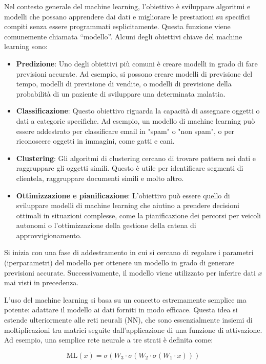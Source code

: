 Nel contesto generale del machine learning, l'obiettivo è sviluppare algoritmi e modelli che possano apprendere dai dati e migliorare le prestazioni su specifici compiti senza essere programmati esplicitamente. Questa funzione viene comunemente chiamata ``modello''. Alcuni degli obiettivi chiave del machine learning sono:

\begin{itemize}
    \item \textbf{Predizione}: Uno degli obiettivi più comuni è creare modelli in grado di fare previsioni accurate. Ad esempio, si possono creare modelli di previsione del tempo, modelli di previsione di vendite, o modelli di previsione della probabilità di un paziente di sviluppare una determinata malattia.
    \item \textbf{Classificazione}: Questo obiettivo riguarda la capacità di assegnare oggetti o dati a categorie specifiche. Ad esempio, un modello di machine learning può essere addestrato per classificare email in "spam" o "non spam", o per riconoscere oggetti in immagini, come gatti e cani.
    \item \textbf{Clustering}: Gli algoritmi di clustering cercano di trovare pattern nei dati e raggruppare gli oggetti simili. Questo è utile per identificare segmenti di clientela, raggruppare documenti simili e molto altro.
    \item \textbf{Ottimizzazione e pianificazione}: L'obiettivo può essere quello di sviluppare modelli di machine learning che aiutino a prendere decisioni ottimali in situazioni complesse, come la pianificazione dei percorsi per veicoli autonomi o l'ottimizzazione della gestione della catena di approvvigionamento.
\end{itemize}

Si inizia con una fase di addestramento in cui si cercano di regolare i 
parametri (iperparametri) del modello per ottenere un modello in grado di 
generare previsioni accurate. Successivamente, il modello viene utilizzato 
per inferire dati $x$ mai visti in precedenza.

L'uso del machine learning si basa su un concetto estremamente semplice ma potente: adattare il modello ai dati forniti in 
modo efficace. Questa idea si estende ulteriormente alle reti neurali (NN), 
che sono essenzialmente insiemi di moltiplicazioni tra matrici seguite 
dall'applicazione di una funzione di attivazione. Ad esempio, una 
semplice rete neurale a tre strati è definita come:

$$\mathrm{ML}(x) = \sigma(W_3 \cdot \sigma(W_2 \cdot \sigma(W_1 \cdot x)))$$

